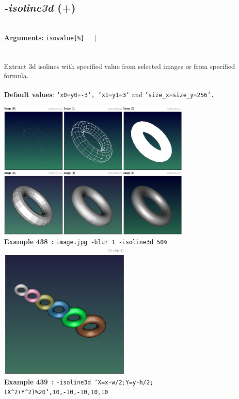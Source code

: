 \documentclass[a4paper,11pt,twoside]{book}
\begin{document}
\subsection{\emph{-isoline3d} (+)}\vspace*{-0.5em}
~\\\textbf{Arguments: } 
{\small \texttt{isovalue[\%]}}~~~$|$\\
\\~\\
Extract 3d isolines with specified value from selected images or from specified formula.
~\\~\\\textbf{Default values}: {\small \texttt{'x0=y0=-3', 'x1=y1=3'} and \texttt{'size\_x=size\_y=256'.}}
\begin{center}\includegraphics[keepaspectratio=true,height=7cm,width=\textwidth]{img/gmic_def438.jpg}\\
{\footnotesize \textbf{Example 438~:} \texttt{image.jpg -blur 1 -isoline3d 50\%}}
\\\includegraphics[keepaspectratio=true,height=7cm,width=\textwidth]{img/gmic_def439.jpg}\\
{\footnotesize \textbf{Example 439~:} \texttt{-isoline3d 'X=x-w/2;Y=y-h/2;(X\textasciicircum 2+Y\textasciicircum 2)\%20',10,-10,-10,10,10}}
\end{center}
\end{document}
